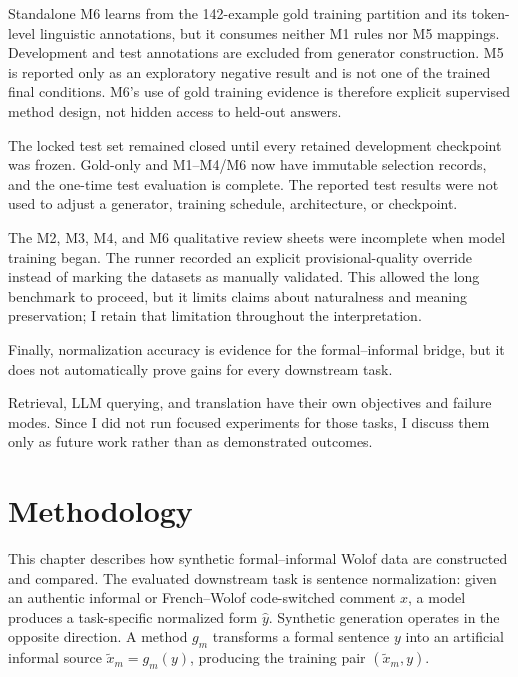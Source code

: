 \documentclass[12pt, a4paper, twoside, openany]{report}
\begin{document}
Standalone M6 learns from the 142-example gold training partition and its token-level linguistic annotations, but it consumes neither M1 rules nor M5 mappings. Development and test annotations are excluded from generator construction. M5 is reported only as an exploratory negative result and is not one of the trained final conditions. M6's use of gold training evidence is therefore explicit supervised method design, not hidden access to held-out answers.

The locked test set remained closed until every retained development checkpoint was frozen. Gold-only and M1--M4/M6 now have immutable selection records, and the one-time test evaluation is complete. The reported test results were not used to adjust a generator, training schedule, architecture, or checkpoint.

The M2, M3, M4, and M6 qualitative review sheets were incomplete when model training began. The runner recorded an explicit provisional-quality override instead of marking the datasets as manually validated. This allowed the long benchmark to proceed, but it limits claims about naturalness and meaning preservation; I retain that limitation throughout the interpretation.

Finally, normalization accuracy is evidence for the formal--informal bridge, but it does not automatically prove gains for every downstream task.

Retrieval, LLM querying, and translation have their own objectives and failure modes. Since I did not run focused experiments for those tasks, I discuss them only as future work rather than as demonstrated outcomes.

\chapter{Methodology}
\label{chap:method}

This chapter describes how synthetic formal--informal Wolof data are constructed and compared. The evaluated downstream task is sentence normalization: given an authentic informal or French--Wolof code-switched comment $x$, a model produces a task-specific normalized form $\hat{y}$. Synthetic generation operates in the opposite direction. A method $g_m$ transforms a formal sentence $y$ into an artificial informal source $\tilde{x}_m=g_m(y)$, producing the training pair $(\tilde{x}_m,y)$.
\end{document}
